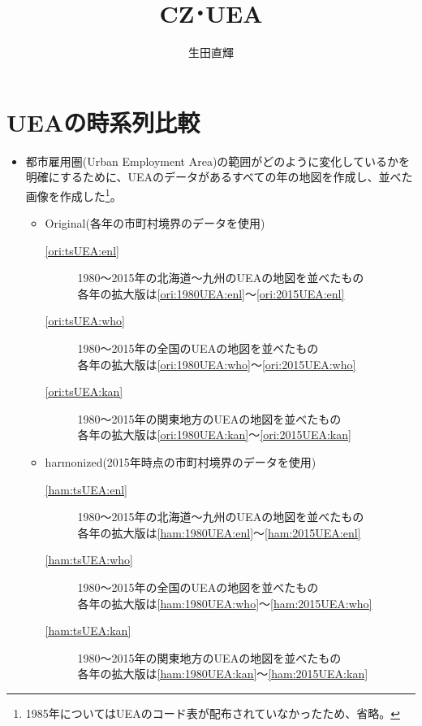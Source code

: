 \documentclass{ltjsarticle}
\title{CZ･UEA}
\author{生田直輝}
\begin{document}
\section{UEAの時系列比較}
\begin{itemize}
  \item 都市雇用圏(Urban Employment Area)の範囲がどのように変化しているかを明確にするために、UEAのデータがあるすべての年の地図を作成し、並べた画像を作成した\footnote{1985年についてはUEAのコード表が配布されていなかったため、省略。}。
  \begin{itemize}
    \item Original(各年の市町村境界のデータを使用)
    \begin{description}
      \item[\ref{ori:tsUEA:enl}] 1980～2015年の北海道～九州のUEAの地図を並べたもの \\ 各年の拡大版は\ref{ori:1980UEA:enl}～\ref{ori:2015UEA:enl}
      \item[\ref{ori:tsUEA:who}] 1980～2015年の全国のUEAの地図を並べたもの \\ 各年の拡大版は\ref{ori:1980UEA:who}～\ref{ori:2015UEA:who}
      \item[\ref{ori:tsUEA:kan}] 1980～2015年の関東地方のUEAの地図を並べたもの \\ 各年の拡大版は\ref{ori:1980UEA:kan}～\ref{ori:2015UEA:kan}
    \end{description}
    \item harmonized(2015年時点の市町村境界のデータを使用)
    \begin{description}
      \item[\ref{ham:tsUEA:enl}] 1980～2015年の北海道～九州のUEAの地図を並べたもの \\ 各年の拡大版は\ref{ham:1980UEA:enl}～\ref{ham:2015UEA:enl}
      \item[\ref{ham:tsUEA:who}] 1980～2015年の全国のUEAの地図を並べたもの \\ 各年の拡大版は\ref{ham:1980UEA:who}～\ref{ham:2015UEA:who}
      \item[\ref{ham:tsUEA:kan}] 1980～2015年の関東地方のUEAの地図を並べたもの \\ 各年の拡大版は\ref{ham:1980UEA:kan}～\ref{ham:2015UEA:kan}
    \end{description}
  \end{itemize}
\end{itemize}
\end{document}
